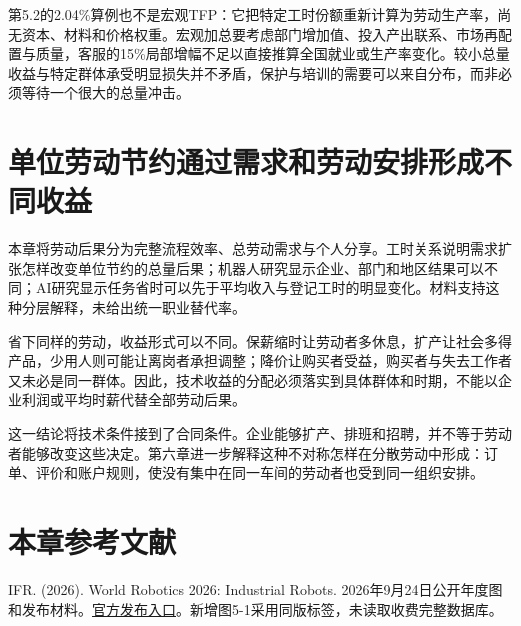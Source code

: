 \documentclass[UTF8,fontset=windows,12pt,a4paper,oneside,openany]{ctexbook}
\begin{document}
第5.2的2.04\%算例也不是宏观TFP：它把特定工时份额重新计算为劳动生产率，尚无资本、材料和价格权重。宏观加总要考虑部门增加值、投入产出联系、市场再配置与质量，客服的15\%局部增幅不足以直接推算全国就业或生产率变化。较小总量收益与特定群体承受明显损失并不矛盾，保护与培训的需要可以来自分布，而非必须等待一个很大的总量冲击。



\section{单位劳动节约通过需求和劳动安排形成不同收益}

本章将劳动后果分为完整流程效率、总劳动需求与个人分享。工时关系说明需求扩张怎样改变单位节约的总量后果；机器人研究显示企业、部门和地区结果可以不同；AI研究显示任务省时可以先于平均收入与登记工时的明显变化。材料支持这种分层解释，未给出统一职业替代率。

省下同样的劳动，收益形式可以不同。保薪缩时让劳动者多休息，扩产让社会多得产品，少用人则可能让离岗者承担调整；降价让购买者受益，购买者与失去工作者又未必是同一群体。因此，技术收益的分配必须落实到具体群体和时期，不能以企业利润或平均时薪代替全部劳动后果。

这一结论将技术条件接到了合同条件。企业能够扩产、排班和招聘，并不等于劳动者能够改变这些决定。第六章进一步解释这种不对称怎样在分散劳动中形成：订单、评价和账户规则，使没有集中在同一车间的劳动者也受到同一组织安排。

\section*{本章参考文献}

IFR. (2026). World Robotics 2026: Industrial Robots. 2026年9月24日公开年度图和发布材料。\href{https://ifr.org/ifr-press-releases/news/five-million-robots-now-operate-in-factories-globally}{官方发布入口}。新增图5-1采用同版标签，未读取收费完整数据库。
\end{document}
